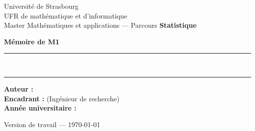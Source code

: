 \begin{titlepage}
\centering
\vspace*{1cm}

{\large Université de Strasbourg \\[0.2cm]
UFR de mathématique et d'informatique \\[0.2cm]
Master Mathématiques et applications --- Parcours \textbf{Statistique}\par}

\vfill

{\Large\bfseries Mémoire de M1\par}
\vspace{0.8cm}
\rule{\linewidth}{0.4pt}\\[0.4cm]
{\huge\bfseries \titrememoire \par}
\vspace{0.4cm}
\rule{\linewidth}{0.4pt}

\vfill

\begin{flushleft}
\textbf{Auteur :} \auteur \\[0.3cm]
\textbf{Encadrant :} \encadrant{} (Ingénieur de recherche) \\[0.3cm]
\textbf{Année universitaire :} \anneeuniv
\end{flushleft}

\vfill
{\small Version de travail --- \today\par}
\end{titlepage}
